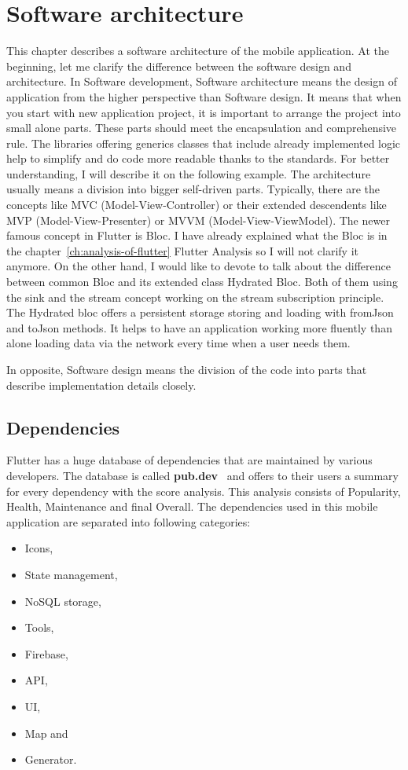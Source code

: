 \chapter{Software architecture}\label{ch:software-architecture}
This chapter describes a software architecture of the mobile application.
At the beginning, let me clarify the difference between the software design and architecture.
In Software development, Software architecture means the design of application from the higher perspective than Software design.
It means that when you start with new application project, it is important to arrange the project into small alone parts.
These parts should meet the encapsulation and comprehensive rule.
The libraries offering generics classes that include already implemented logic help to simplify and do code more readable thanks to the standards.
For better understanding, I will describe it on the following example.
The architecture usually means a division into bigger self-driven parts.
Typically, there are the concepts like MVC (Model-View-Controller) or their extended descendents like MVP (Model-View-Presenter) or MVVM (Model-View-ViewModel).
The newer famous concept in Flutter is Bloc.
I have already explained what the Bloc is in the chapter~\ref{ch:analysis-of-flutter} Flutter Analysis so I will not clarify it anymore.
On the other hand, I would like to devote to talk about the difference between common Bloc and its extended class Hydrated Bloc.
Both of them using the sink and the stream concept working on the stream subscription principle.
The Hydrated bloc offers a persistent storage storing and loading with fromJson and toJson methods.
It helps to have an application working more fluently than alone loading data via the network every time when a user needs them.

In opposite, Software design means the division of the code into parts that describe implementation details closely.

\section{Dependencies}\label{sec:dependencies}
Flutter has a huge database of dependencies that are maintained by various developers.
The database is called \textbf{pub.dev}~\cite{pubDev} and offers to their users a summary for every dependency with the score analysis.
This analysis consists of Popularity, Health, Maintenance and final Overall.
The dependencies used in this mobile application are separated into following categories:
\begin{itemize}
    \item Icons,
    \item State management,
    \item NoSQL storage,
    \item Tools,
    \item Firebase,
    \item API,
    \item UI,
    \item Map and
    \item Generator.
\end{itemize}

